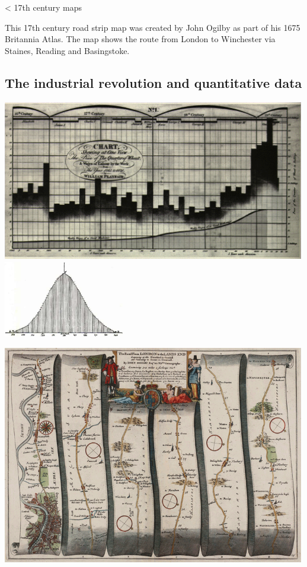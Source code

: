 \documentclass[
  letterpaper,
  DIV=11,
  numbers=noendperiod]{scrartcl}
\begin{document}
\textless{} 17th century maps

This 17th century road strip map was created by John Ogilby as part of
his 1675 Britannia Atlas. The map shows the route from London to
Winchester via Staines, Reading and Basingstoke.

\hypertarget{the-industrial-revolution-and-quantitative-data}{%
\subsection{The industrial revolution and quantitative
data}\label{the-industrial-revolution-and-quantitative-data}}

\includegraphics[width=5.20833in,height=\textheight]{images/Playfair_1821.png}
\includegraphics[width=2.08333in,height=\textheight]{images/binomial-quetelet-1846.jpg}

\includegraphics[width=5.20833in,height=\textheight]{images/1675-Ogilby-The_Road_From_LONDON_to_the_LANDS_END.png}
\end{document}
